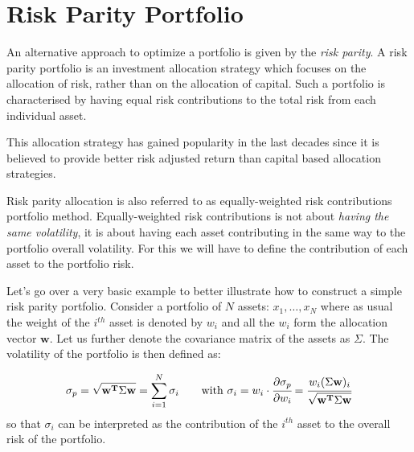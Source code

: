%

\section{Risk Parity Portfolio}
\label{risk-parity-portfolio}

An alternative approach to optimize a portfolio is given by the \emph{risk parity}. A risk parity portfolio is an investment allocation strategy which focuses on the allocation of risk, rather than on the allocation of capital. 
Such a portfolio is characterised by having equal risk contributions to the total risk from each individual asset. 

This allocation strategy has gained popularity in the last decades since it is believed to provide better risk adjusted return than capital based allocation strategies.

Risk parity allocation is also referred to as equally-weighted risk contributions portfolio method. Equally-weighted risk contributions is not about \emph{having the same volatility}, it is about having each asset contributing in the same way to the portfolio overall volatility. For this we will have to define the contribution of each asset to the portfolio risk. 

Let's go over a very basic example to better illustrate how to construct a simple risk parity portfolio. Consider a portfolio of \(N\) assets: \(x_{1}, \ldots, x_N\) where as
usual the weight of the $i^{th}$ asset is denoted by \(w_{i}\) and all the \(w_{i}\) form the allocation vector \(\mathbf{w}\). Let us further denote the covariance matrix of the assets as \(\Sigma\). The volatility of the portfolio is then defined as:

\begin{equation} 
\sigma_p={\sqrt {\mathbf{w^T}\Sigma \mathbf{w}}} = \sum_{i=1}^{N}\sigma _{i}\qquad\textrm{with}~\sigma _{i} = w_{i}\cdot \cfrac{\partial\sigma_p}{\partial w_{i}}={\cfrac {w_{i}(\Sigma \mathbf{w})_{i}}{\sqrt {\mathbf{w^T}\Sigma \mathbf{w}}}}
\end{equation}
so that \(\sigma _{i}\) can be interpreted as the contribution of the $i^{th}$ asset to the overall risk of the portfolio.

